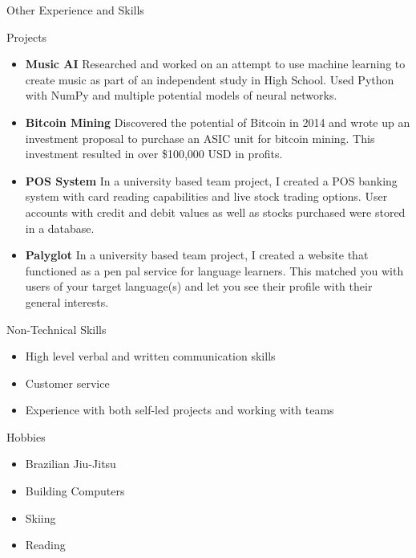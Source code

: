 \documentclass[]{mcdowellcv}
\begin{document}
	\begin{cvsection}{Other Experience and Skills}
		\begin{cvsubsection}{Projects}{}{}
			\begin{itemize}
				\item \textbf{Music AI} Researched and worked on an attempt to use machine learning to create music as part of an independent study in High School. Used Python with NumPy and multiple potential models of neural networks. 
                    \item \textbf{Bitcoin Mining} Discovered the potential of Bitcoin in 2014 and wrote up an investment proposal to purchase an ASIC unit for bitcoin mining. This investment resulted in over \$100,000 USD in profits.
                    \item \textbf{POS System} In a university based team project, I created a POS banking system with card reading capabilities and live stock trading options. User accounts with credit and debit values as well as stocks purchased were stored in a database.
                    \item \textbf{Palyglot} In a university based team project, I created a website that functioned as a pen pal service for language learners. This matched you with users of your target language(s) and let you see their profile with their general interests.
				
			\end{itemize}
		\end{cvsubsection}
		\begin{cvsubsection}{Non-Technical Skills}{}{}
			\begin{itemize}
				\item High level verbal and written communication skills
				\item Customer service
				\item Experience with both self-led projects and working with teams
			\end{itemize}
		\end{cvsubsection}
		\begin{cvsubsection}{Hobbies}{}{}
			\begin{itemize}
                    \item Brazilian Jiu-Jitsu
                    \item Building Computers
		    \item Skiing
                    \item Reading 
			\end{itemize}
		\end{cvsubsection}
	\end{cvsection}
	
\end{document}
